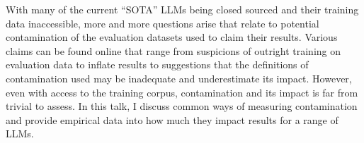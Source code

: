 With many of the current ``SOTA'' LLMs being closed sourced and their training data inaccessible, more and more questions arise that relate to potential contamination of the evaluation datasets used to claim their results. Various claims can be found online that range from suspicions of outright training on evaluation data to inflate results to suggestions that the definitions of contamination used may be inadequate and underestimate its impact. However, even with access to the training corpus, contamination and its impact is far from trivial to assess. In this talk, I discuss common ways of measuring contamination and provide empirical data into how much they impact results for a range of LLMs.